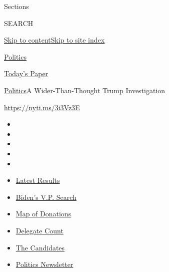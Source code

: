 Sections

SEARCH

\protect\hyperlink{site-content}{Skip to
content}\protect\hyperlink{site-index}{Skip to site index}

\href{https://www.nytimes3xbfgragh.onion/section/politics}{Politics}

\href{https://myaccount.nytimes3xbfgragh.onion/auth/login?response_type=cookie\&client_id=vi}{}

\href{https://www.nytimes3xbfgragh.onion/section/todayspaper}{Today's
Paper}

\href{/section/politics}{Politics}\textbar{}A Wider-Than-Thought Trump
Investigation

\url{https://nyti.ms/3i3Vz3E}

\begin{itemize}
\item
\item
\item
\item
\item
\end{itemize}

\begin{itemize}
\item
  \href{https://www.nytimes3xbfgragh.onion/interactive/2020/08/04/us/elections/results-arizona-kansas-michigan-missouri-primaries.html?action=click\&pgtype=Article\&state=default\&region=TOP_BANNER\&context=storylines_menu}{Latest
  Results}
\item
  \href{https://www.nytimes3xbfgragh.onion/article/biden-vice-president-2020.html?action=click\&pgtype=Article\&state=default\&region=TOP_BANNER\&context=storylines_menu}{Biden's
  V.P. Search}
\item
  \href{https://www.nytimes3xbfgragh.onion/interactive/2020/07/24/us/politics/trump-biden-campaign-donors.html?action=click\&pgtype=Article\&state=default\&region=TOP_BANNER\&context=storylines_menu}{Map
  of Donations}
\item
  \href{https://www.nytimes3xbfgragh.onion/interactive/2020/us/elections/delegate-count-primary-results.html?action=click\&pgtype=Article\&state=default\&region=TOP_BANNER\&context=storylines_menu}{Delegate
  Count}
\item
  \href{https://www.nytimes3xbfgragh.onion/interactive/2019/us/politics/2020-presidential-candidates.html?action=click\&pgtype=Article\&state=default\&region=TOP_BANNER\&context=storylines_menu}{The
  Candidates}
\item
  \href{https://www.nytimes3xbfgragh.onion/newsletters/politics?action=click\&pgtype=Article\&state=default\&region=TOP_BANNER\&context=storylines_menu}{Politics
  Newsletter}
\end{itemize}


